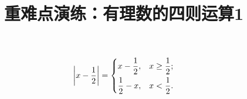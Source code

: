 \documentclass[fleqn]{article}                                       %
\title{重难点演练：有理数的四则运算1}                                              %
\date{}                                                              %
\begin{document}
\hspace{4cm}{\Large 公式}                                 %

\noindent %


\[\left\lvert x- \frac12 \right\rvert=\begin{dcases}
x-\frac12,& x\geq \frac12;\\
\frac12-x,& x<\frac12.
\end{dcases}\]
\end{document}
